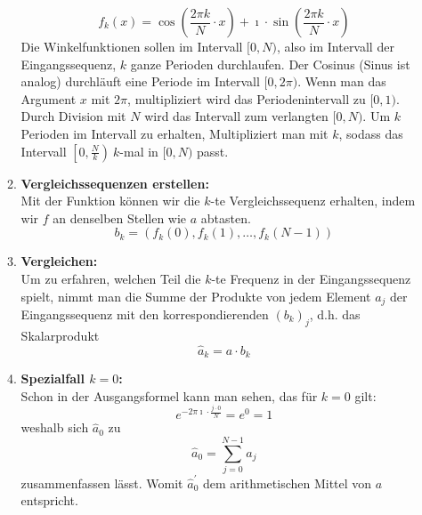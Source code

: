 \begin{itemize}
\begin{enumerate}
		\[f_k(x) = \cos\left(\frac{2\pi k}{N}\cdot x\right) + \imath \cdot\sin\left(\frac{2\pi k}{N}\cdot x\right) \]
		Die Winkelfunktionen sollen im Intervall \([0,N)\), also im Intervall der Eingangssequenz, \(k\) ganze Perioden durchlaufen. Der Cosinus (Sinus ist analog) durchläuft eine Periode im Intervall \([0,2\pi)\). Wenn man das Argument \(x\) mit \(2\pi\), multipliziert wird das Periodenintervall zu \([0,1)\). Durch Division mit \(N\) wird das Intervall zum verlangten \([0,N)\). Um \(k\) Perioden im Intervall zu erhalten, Multipliziert man mit \(k\), sodass das Intervall \(\left[0,\frac{N}{k}\right) ~k\)-mal in \([0,N)\) passt.
		\item \textbf{Vergleichssequenzen erstellen:}\\
		Mit der Funktion können wir die \(k\)-te Vergleichssequenz erhalten, indem wir \(f\) an denselben Stellen wie \(a\) abtasten.
		\[b_k = \left(f_k(0),f_k(1),\dots,f_k(N-1)\right) \]
		\item \textbf{Vergleichen:}\\
		Um zu erfahren, welchen Teil die \(k\)-te Frequenz in der Eingangssequenz spielt, nimmt man die Summe der Produkte von jedem Element \(a_j\) der Eingangssequenz mit den korrespondierenden \({(b_k)}_j\), d.h. das Skalarprodukt
		\[\hat{a}_k = a \cdot b_k\]
		\item \textbf{Spezialfall \(k = 0\):}\\
		Schon in der Ausgangsformel kann man sehen, das	für \(k = 0\) gilt: \[e^{-2\pi \imath \cdot\frac{j\cdot 0}{N}} = e^0 = 1\]
		weshalb sich \(\hat{a}_0\) zu
		\[\hat{a}_0 = \sum_{j=0}^{N-1} a_j\] zusammenfassen lässt. Womit \(\hat{a}^\prime_0 \) dem arithmetischen Mittel von \(a\) entspricht.
	\end{enumerate}
\end{itemize}%
